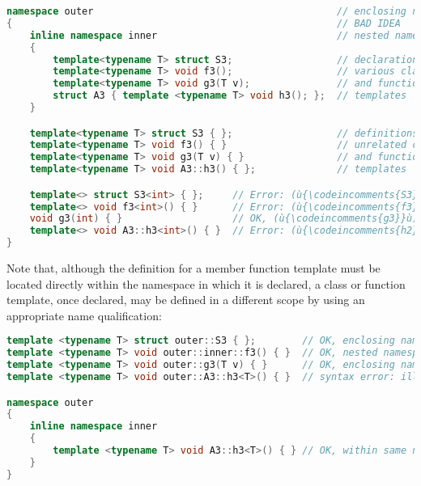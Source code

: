 \begin{lstlisting}[language=C++]
namespace outer                                          // enclosing namespace
{                                                        // BAD IDEA
    inline namespace inner                               // nested namespace
    {
        template<typename T> struct S3;                  // declarations of
        template<typename T> void f3();                  // various class
        template<typename T> void g3(T v);               // and function
        struct A3 { template <typename T> void h3(); };  // templates
    }

    template<typename T> struct S3 { };                  // definitions of
    template<typename T> void f3() { }                   // unrelated class
    template<typename T> void g3(T v) { }                // and function
    template<typename T> void A3::h3() { };              // templates

    template<> struct S3<int> { };     // Error: (ù{\codeincomments{S3}}ù) is ambiguous in (ù{\codeincomments{outer}}ù).
    template<> void f3<int>() { }      // Error: (ù{\codeincomments{f3}}ù) is ambiguous in (ù{\codeincomments{outer}}ù).
    void g3(int) { }                   // OK, (ù{\codeincomments{g3}}ù) is an *overload* definition.
    template<> void A3::h3<int>() { }  // Error: (ù{\codeincomments{h2}}ù) is ambiguous in (ù{\codeincomments{outer}}ù).
}
\end{lstlisting}
    
\noindent Note that, although the definition for a member function template must
be located directly within the namespace in which it is declared, a
class or function template, once declared, may be defined in a different
scope by using an appropriate name qualification:

\begin{lstlisting}[language=C++]
template <typename T> struct outer::S3 { };        // OK, enclosing namespace
template <typename T> void outer::inner::f3() { }  // OK, nested namespace
template <typename T> void outer::g3(T v) { }      // OK, enclosing namespace
template <typename T> void outer::A3::h3<T>() { }  // syntax error: ill-formed

namespace outer
{
    inline namespace inner
    {
        template <typename T> void A3::h3<T>() { } // OK, within same namespace
    }
}
\end{lstlisting}
    
